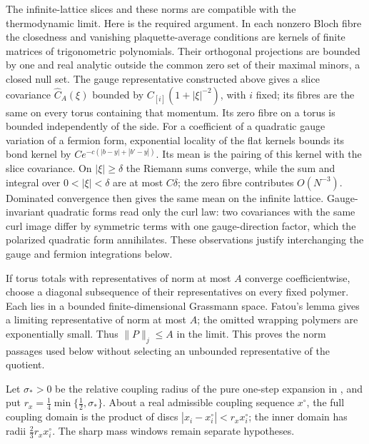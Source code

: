 \documentclass[11pt,letterpaper,reqno]{amsart}
\theoremstyle{definition}
\theoremstyle{remark}
\begin{document}
The infinite-lattice slices and these norms are compatible
with the thermodynamic limit.  Here is the required argument.
In each nonzero Bloch fibre the closedness and vanishing
plaquette-average conditions are kernels of finite matrices
of trigonometric polynomials.  Their orthogonal projections
are bounded by one and real analytic outside the common zero
set of their maximal minors, a closed null set.  The gauge
representative constructed above gives a slice covariance
$\widehat C_A(\xi)$ bounded by
$C_{[i]}(1+|\xi|^{-2})$, with $i$ fixed; its fibres are the
same on every torus containing that momentum.  Its zero
fibre on a torus is bounded independently of the side.
For a coefficient of a quadratic gauge variation of a fermion
form, exponential locality of the flat kernels bounds its
bond kernel by $Ce^{-c(|b-y|+|b'-y|)}$.  Its mean is the
pairing of this kernel with the slice covariance.  On
$|\xi|\ge\delta$ the Riemann sums converge, while the sum
and integral over $0<|\xi|<\delta$ are at most $C\delta$;
the zero fibre contributes $O(N^{-3})$.  Dominated convergence
then gives the same mean on the infinite lattice.
Gauge-invariant quadratic forms read only the curl law:
two covariances with the same curl image differ by symmetric
terms with one gauge-direction factor, which the polarized
quadratic form annihilates.  These observations justify
interchanging the gauge and fermion integrations below.

If torus totals with representatives of norm at most $A$
converge coefficientwise, choose a diagonal subsequence of
their representatives on every fixed polymer.  Each lies
in a bounded finite-dimensional Grassmann space.  Fatou's
lemma gives a limiting representative of norm at most $A$;
the omitted wrapping polymers are exponentially small.
Thus $\|P\|_j\le A$ in the limit.  This proves the norm
passages used below without selecting an unbounded
representative of the quotient.

Let $\sigma_*>0$ be the relative coupling radius of the pure
one-step expansion in \cite[equation~(890) and Theorem~V]{YMM1},
and put $r_x=\tfrac14\min\{\tfrac12,\sigma_*\}$.
About a real admissible coupling sequence $x^\circ$, the full
coupling domain is the product of discs
$|x_i-x_i^\circ|<r_xx_i^\circ$; the inner domain has radii
$\tfrac23r_xx_i^\circ$. The sharp mass windows remain separate
hypotheses.
\end{document}
